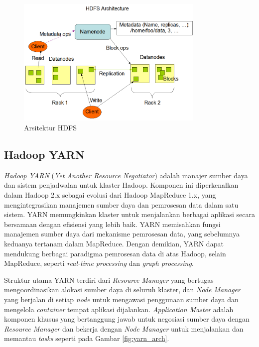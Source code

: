 \begin{figure}[h]
    \centering
    \includegraphics[width=0.8\textwidth]{figures/ch02/hdfsarchitecture}
    \caption{Arsitektur HDFS \cite{ApacheHadoopHDFS}}
    \label{fig:hdfs-arch}
\end{figure}

\subsection{Hadoop YARN}
\textit{Hadoop YARN} (\textit{Yet Another Resource Negotiator}) adalah manajer sumber daya dan sistem penjadwalan untuk klaster Hadoop. Komponen ini diperkenalkan dalam Hadoop 2.x sebagai evolusi dari Hadoop MapReduce 1.x, yang mengintegrasikan manajemen sumber daya dan pemrosesan data dalam satu sistem. YARN memungkinkan klaster untuk menjalankan berbagai aplikasi secara bersamaan dengan efisiensi yang lebih baik. YARN memisahkan fungsi manajemen sumber daya dari mekanisme pemrosesan data, yang sebelumnya keduanya tertanam dalam MapReduce. Dengan demikian, YARN dapat mendukung berbagai paradigma pemrosesan data di atas Hadoop, selain MapReduce, seperti \textit{real-time processing} dan \textit{graph processing}.

Struktur utama YARN terdiri dari \textit{Resource Manager} yang bertugas mengoordinasikan alokasi sumber daya di seluruh klaster, dan \textit{Node Manager} yang berjalan di setiap \textit{node} untuk mengawasi penggunaan sumber daya dan mengelola \textit{container} tempat aplikasi dijalankan. \textit{Application Master} adalah komponen khusus yang bertanggung jawab untuk negosiasi sumber daya dengan \textit{Resource Manager} dan bekerja dengan \textit{Node Manager} untuk menjalankan dan memantau \textit{tasks} seperti pada Gambar \ref{fig:yarn_arch}.

